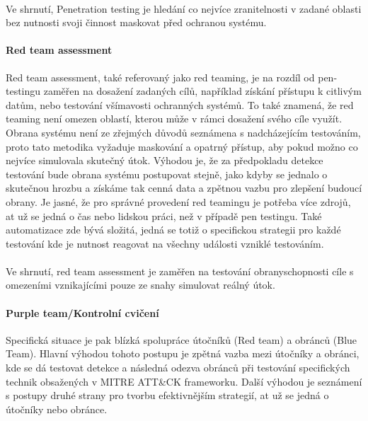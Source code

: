 \paragraph{}
Ve shrnutí, Penetration testing je hledání co nejvíce zranitelnosti v zadané oblasti bez nutnosti svoji činnost maskovat před ochranou systému.\cite{securityInteligence_pen_test_red_team_purple_team, lootsec_pen_test_vs_red_team, astra_pen_test_vs_red_teaming}


\paragraph{Red team assessment}

Red team assessment, také referovaný jako red teaming, je na rozdíl od pen-testingu zaměřen na dosažení zadaných cílů, například získání přístupu k citlivým datům, nebo testování všímavosti ochranných systémů.
To také znamená, že red teaming není omezen oblastí, kterou může v rámci dosažení svého cíle využít.
Obrana systému není ze zřejmých důvodů seznámena s nadcházejícím testováním, proto tato metodika vyžaduje maskování a opatrný přístup, aby pokud možno co nejvíce simulovala skutečný útok.
Výhodou je, že za předpokladu detekce testování bude obrana systému postupovat stejně, jako kdyby se jednalo o skutečnou hrozbu a získáme tak cenná data a zpětnou vazbu pro zlepšení budoucí obrany.
Je jasné, že pro správné provedení red teamingu je potřeba více zdrojů, at už se jedná o čas nebo lidskou práci, než v případě pen testingu.
Také automatizace zde bývá složitá, jedná se totiž o specifickou strategii pro každé testování kde je nutnost reagovat na všechny události vzniklé testováním.\cite{securityInteligence_pen_test_red_team_purple_team, lootsec_pen_test_vs_red_team, astra_pen_test_vs_red_teaming}

\paragraph{}
Ve shrnutí, red team assessment je zaměřen na testování obranyschopnosti cíle s omezeními vznikajícími pouze ze snahy simulovat reálný útok.


\paragraph{Purple team/Kontrolní cvičení}
Specifická situace je pak blízká spolupráce útočníků (Red team) a obránců (Blue Team).
Hlavní výhodou tohoto postupu je zpětná vazba mezi útočníky a obránci, kde se dá testovat detekce a následná odezva obránců při testování specifických technik obsažených v MITRE ATT\&CK frameworku.
Další výhodou je seznámení s postupy druhé strany pro tvorbu efektivnějším strategií, at už se jedná o útočníky nebo obránce.
